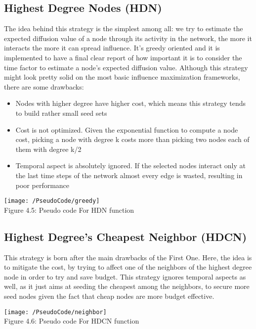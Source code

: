 \subsection{Highest Degree Nodes (HDN)}
\label{sec:stratgreedy}
The idea behind this strategy is the simplest among all: we try to estimate the expected diffusion value of a node through its activity in the network, the more it interacts the more it can spread influence. It's greedy oriented and it is implemented to have a final clear report of how important it is to consider the time factor to estimate a node's expected diffusion value. Although this strategy might look pretty solid on the most basic influence maximization frameworks, there are some drawbacks:
\begin{itemize}
    \item Nodes with higher degree have higher cost, which means this strategy tends to build rather small seed sets
    \item Cost is not optimized. Given the exponential function to compute a node cost, picking a node with degree k costs more than picking two nodes each of them with degree k/2
    \item Temporal aspect is absolutely ignored. If the selected nodes interact only at the last time steps of the network almost every edge is wasted, resulting in poor performance
\end{itemize}

\begin{center}
    \texttt{[image: /PseudoCode/greedy]}
    \\
    Figure 4.5: Pseudo code For HDN function
\end{center}

\subsection{Highest Degree's Cheapest Neighbor (HDCN)}
\label{sec:stratneighbors}
This strategy is born after the main drawbacks of the First One. Here, the idea is to mitigate the cost, by trying to affect one of the neighbors of the highest degree node in order to try and save budget. This strategy ignores temporal aspects as well, as it just aims at seeding the cheapest among the neighbors, to secure more seed nodes given the fact that cheap nodes are more budget effective. 

\begin{center}
    \texttt{[image: /PseudoCode/neighbor]}
    \\
    Figure 4.6: Pseudo code For HDCN function
\end{center}

